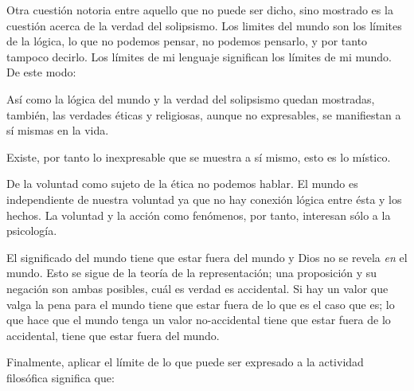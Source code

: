 Otra cuestión notoria entre aquello que no puede ser dicho, sino mostrado es la
cuestión acerca de la verdad del solipsismo. Los limites del mundo son los
límites de la lógica, lo que no podemos pensar, no podemos pensarlo, y por tanto
tampoco decirlo. Los límites de mi lenguaje significan los límites de mi
mundo.\autocite[cf~.][5.6~y~5.61]{tractatus} De este modo:

Así como la lógica del mundo y la verdad del solipsismo quedan mostradas,
también, las verdades éticas y religiosas, aunque no expresables, se manifiestan
a sí mismas en la vida. 

Existe, por tanto lo inexpresable que se muestra a sí mismo, esto es lo
místico.\autocite[cf.~][6.522]{tractatus}

De la voluntad como sujeto de la ética no podemos
hablar\autocite[cf.~][6.423]{tractatus}. El mundo es independiente de nuestra
voluntad ya que no hay conexión lógica entre ésta y los hechos.
La voluntad y la acción como fenómenos, por tanto, interesan sólo a la
psicología.\autocite[cf.~][p.171 \S3]{IWT}

El significado del mundo tiene que estar fuera del
mundo\autocite[cf.~][6.41]{tractatus} y Dios no se revela \emph{en} el
mundo\autocite[cf.~][6.432]{tractatus}. 
Esto se sigue de la teoría de la representación; una proposición y su negación
son ambas posibles, cuál es verdad es accidental.\autocite[cf.~][p.170 \S4]{IWT}
Si hay un valor que valga la pena para el mundo tiene que estar fuera de lo que
es el caso que es; lo que hace que el mundo tenga un valor no-accidental tiene
que estar fuera de lo accidental, tiene que estar fuera del
mundo.\autocite[cf.~][6.41]{tractatus} 

Finalmente, aplicar el límite de lo que puede ser expresado a la actividad
filosófica significa que:

